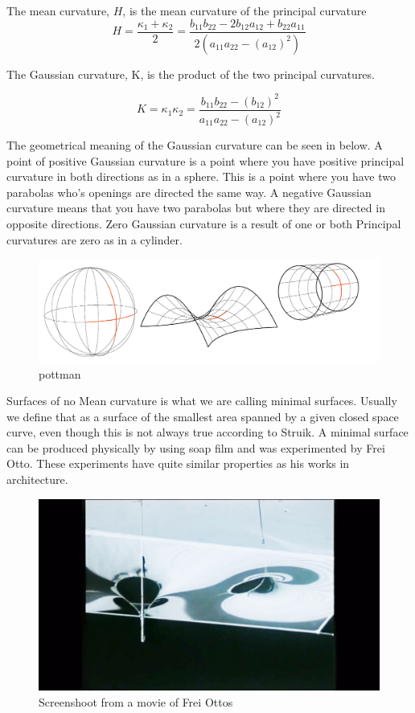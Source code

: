 The mean curvature, $H$, is the mean curvature of the principal curvature
\begin{equation}
H = \frac{\kappa_1 + \kappa_2}{2} =\frac{b_{11}b_{22} - 2b_{12}a_{12} + b_{22}a_{11}}{2(a_{11}a_{22} - (a_{12})^2)}
\end{equation}

The Gaussian curvature, K, is the product of the two
principal curvatures.

\begin{equation}
K = {\kappa_1 \kappa_2} = \frac{b_{11} b_{22} - (b_{12})^2}{a_{11}a_{22} - (a_{12})^2}
\end{equation}

The geometrical meaning of the Gaussian curvature can be seen in below.  A point of positive Gaussian curvature is a point where you have positive principal curvature in both directions as in a sphere. This is a point where you have two parabolas who's openings are directed the same way. A negative Gaussian curvature means that you have two parabolas but where they are directed in opposite directions. Zero Gaussian curvature is a result of one or both Principal curvatures are zero as in a cylinder.

\begin{figure}[H] 
\centering
\includegraphics[width=1\linewidth ]{figure/Theory/GaussForms.pdf}
\caption{pottman}
\end{figure}

Surfaces of no Mean curvature is what we are calling minimal surfaces. Usually we define that as a surface of the smallest area spanned by a given closed space curve, even though this is not always true according to Struik. 
A minimal surface can be produced physically by using soap film and was experimented by Frei Otto. These experiments have quite similar properties as his works in architecture. 

\begin{figure}[H] 
\centering
\includegraphics[width=0.9\linewidth ]{figure/Theory/SoapSreeen.jpg}
\caption{Screenshoot from a movie of Frei Ottos}
\end{figure}


